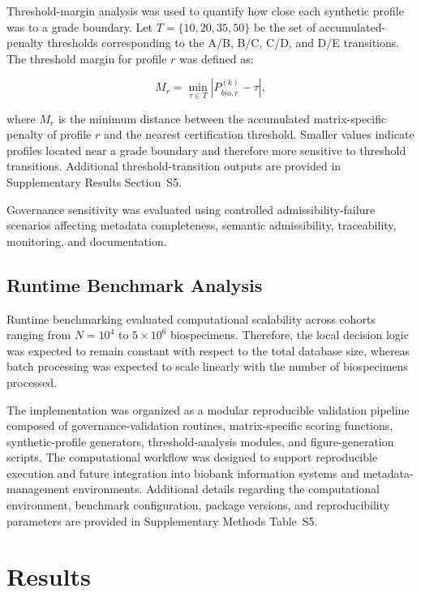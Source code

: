 \documentclass[preprint,12pt]{elsarticle}
\begin{document}
Threshold-margin analysis was used to quantify how close each synthetic profile was to a grade boundary. Let \(T=\{10,20,35,50\}\) be the set of accumulated-penalty thresholds corresponding 
to the A/B, B/C, C/D, and D/E transitions. The threshold margin for profile \(r\) was defined as:

\begin{equation}
M_r = \min_{\tau \in T} |P_{bio,r}^{(k)}-\tau|,
\label{eq:threshold_margin}
\end{equation}

where \(M_r\) is the minimum distance between the accumulated matrix-specific penalty of profile \(r\) and the nearest certification 
threshold. Smaller values indicate profiles located near a grade boundary and therefore more sensitive to threshold transitions. Additional threshold-transition outputs are provided in Supplementary Results Section~S5.

Governance sensitivity was evaluated using controlled admissibility-failure scenarios affecting metadata completeness, semantic admissibility, traceability, monitoring, and 
documentation. 

\subsection{Runtime Benchmark Analysis}\label{runtime_benchmak}

Runtime benchmarking evaluated computational scalability across cohorts ranging from \(N=10^4\) to \(5\times10^6\) biospecimens. Therefore, 
the local decision logic was expected to remain constant with respect to the total database size, whereas batch processing was expected to 
scale linearly with the number of biospecimens processed.

The implementation was organized as a modular reproducible validation pipeline composed of governance-validation routines, matrix-specific 
scoring functions, synthetic-profile generators, threshold-analysis modules, and figure-generation scripts. The computational workflow was 
designed to support reproducible execution and future integration into biobank information systems and metadata-management environments. 
Additional details regarding the computational environment, benchmark configuration, package versions, and reproducibility parameters are 
provided in Supplementary Methods Table~S5.

\section{Results}\label{sec:results}
\end{document}
